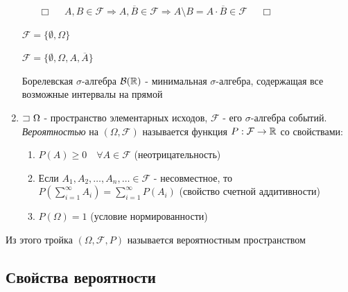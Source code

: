 \documentclass[12pt]{article}
\begin{document}
\begin{enumerate}
\begin{enumerate}
            \begin{tcolorbox}
                $\Box \quad$ $A, B \in \mathcal{F} \Longrightarrow A, \overline{B} \in \mathcal{F} \Longrightarrow A \setminus B = A \cdot \overline{B} \in \mathcal{F}$ $\quad \Box$
            \end{tcolorbox}

        \end{enumerate}

         $\mathcal{F} = \{\emptyset, \Omega\}$

         $\mathcal{F} = \{\emptyset, \Omega, A, \overline{A}\}$

         \Defs Борелевская $\sigma$-алгебра $\mathcal{B}(\mathbb{R})$ - минимальная $\sigma$-алгебра, содержащая все возможные интервалы на прямой


        \item \Defs $\mathord{\sqsupset}\ \Omega$ - пространство элементарных исходов, $\mathcal{F}$ - его $\sigma$-алгебра событий.
        \textit{Вероятностью} на $(\Omega, \mathcal{F})$ называется функция $P: \mathcal{F} \to \mathbb{R}$ со свойствами:

        \begin{enumerate}
            \item $P(A) \geq 0 \quad \forall A \in \mathcal{F}$ (неотрицательность)

            \item Если $A_1, A_2, \dots, A_n, \dots \in \mathcal{F}$ - несовместное, то $P(\sum_{i = 1}^\infty A_i) = \sum_{i = 1}^\infty P(A_i)$ (свойство счетной аддитивности)

            \item $P(\Omega) = 1$ (условие нормированности)
        \end{enumerate}

    \end{enumerate}

    \hypertarget{probabilityspace}{}

    \Def Из этого тройка $(\Omega, \mathcal{F}, P)$ называется вероятностным пространством

    \subsection{Свойства вероятности}

    \hypertarget{probabilityproperties}{}
\end{document}
